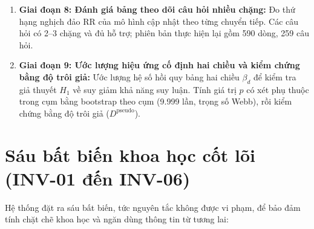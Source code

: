 \begin{enumerate}
    \item \textbf{Giai đoạn 8: Đánh giá bảng theo dõi câu hỏi nhiều chặng:} Đo thứ hạng nghịch đảo RR của mô hình cập nhật theo từng chuyển tiếp. Các câu hỏi có 2--3 chặng và đủ hỗ trợ; phiên bản thực hiện lại gồm 590 dòng, 259 câu hỏi.
    \item \textbf{Giai đoạn 9: Ước lượng hiệu ứng cố định hai chiều và kiểm chứng bằng độ trôi giả:} Ước lượng hệ số hồi quy bảng hai chiều $\beta_d$ để kiểm tra giả thuyết $H_1$ về suy giảm khả năng suy luận. Tính giá trị $p$ có xét phụ thuộc trong cụm bằng bootstrap theo cụm (9.999 lần, trọng số Webb), rồi kiểm chứng bằng độ trôi giả ($D^{\text{pseudo}}$).
\end{enumerate}

\section{Sáu bất biến khoa học cốt lõi (INV-01 đến INV-06)}
\label{sec:scientific_invariants}

Hệ thống đặt ra sáu bất biến, tức nguyên tắc không được vi phạm, để bảo đảm tính chặt chẽ khoa học và ngăn dùng thông tin từ tương lai:

